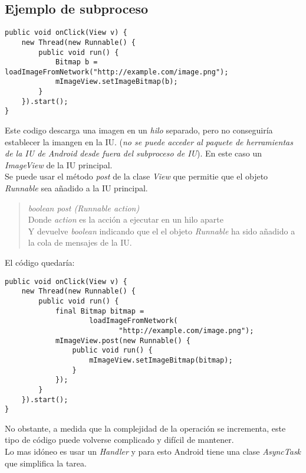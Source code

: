 \documentclass[4paper]{article}
\newcommand{\A}{Android }
\begin{document}
\newpage

\subsection{Ejemplo de subproceso}
\begin{lstlisting}
public void onClick(View v) {
    new Thread(new Runnable() {
        public void run() {
            Bitmap b = loadImageFromNetwork("http://example.com/image.png");
            mImageView.setImageBitmap(b);
        }
    }).start();
}
\end{lstlisting}
Este codigo descarga una imagen en un \emph{hilo} separado, pero no conseguiría establecer la imangen en la IU. (\emph{no se puede acceder al paquete de herramientas de la IU de Android desde fuera del subproceso de IU}). En este caso un \emph{ImageView} de la IU principal.\\
Se puede usar el método \emph{post} de la clase \emph{View} que permitie que el objeto \emph{Runnable} sea añadido a la IU principal.
\begin{quote}
\emph{boolean post (Runnable action)}\\
Donde \emph{action} es la acción a ejecutar en un hilo aparte\\
Y devuelve \emph{boolean} indicando que el el objeto \emph{Runnable} ha sido añadido a la cola 	de mensajes de la IU.
\end{quote}
El código quedaría:
\begin{lstlisting}
public void onClick(View v) {
    new Thread(new Runnable() {
        public void run() {
            final Bitmap bitmap =
                    loadImageFromNetwork(
                           "http://example.com/image.png");
            mImageView.post(new Runnable() {
                public void run() {
                    mImageView.setImageBitmap(bitmap);
                }
            });
        }
    }).start();
}
\end{lstlisting}
No obstante, a medida que la complejidad de la operación se incrementa, este tipo de código puede volverse complicado y difícil de mantener. \\
Lo mas idóneo es usar un \emph{Handler} y para esto \A tiene una clase \emph{AsyncTask} que simplifica la tarea.

\newpage
\end{document}
